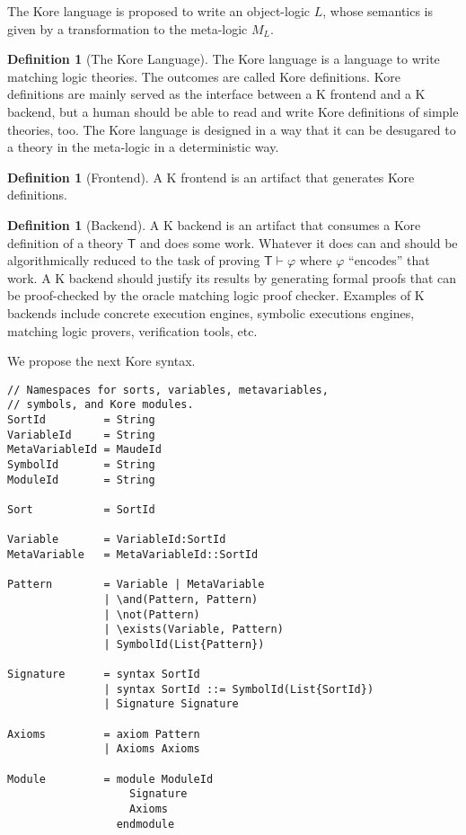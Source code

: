 \documentclass[UTF8]{article}
\newcommand{\comment}[1]
    {\par {\bfseries \color{blue} #1 \par}} %
\newcounter{thmcounter}
\theoremstyle{plain}
\theoremstyle{definition}
\newtheorem{definition}[thmcounter]{Definition}
\theoremstyle{remark}
\begin{document}
The Kore language is proposed to write an object-logic $L$, whose 
semantics is given by a transformation to the meta-logic $M_L$. 
\comment{
\begin{definition}[The Kore Language]
The Kore language is a language to write matching logic theories. The outcomes are called Kore definitions. Kore definitions are mainly served as the interface between a K frontend and a K backend, but a human should be able to read and write Kore definitions of simple theories, too. The Kore language is designed in a way that it can be desugared to a theory in the meta-logic in a deterministic way.
\end{definition}

\begin{definition}[Frontend]
A K frontend is an artifact that generates Kore definitions.
\end{definition}

\begin{definition}[Backend]
A K backend is an artifact that consumes a Kore definition of a theory $\mathsf{T}$ and does some work. Whatever it does can and should be algorithmically reduced to the task of proving $\mathsf{T} \vdash \varphi$ where $\varphi$ ``encodes'' that work. A K backend should justify its results by generating formal proofs that can be proof-checked by the oracle matching logic proof checker. Examples of K backends include concrete execution engines, symbolic executions engines, matching logic provers, verification tools, etc.
\end{definition}
}
We propose the next Kore syntax. 

\begin{Verbatim}[fontsize=\small]
// Namespaces for sorts, variables, metavariables,
// symbols, and Kore modules.
SortId         = String
VariableId     = String
MetaVariableId = MaudeId
SymbolId       = String
ModuleId       = String

Sort           = SortId

Variable       = VariableId:SortId
MetaVariable   = MetaVariableId::SortId

Pattern        = Variable | MetaVariable
               | \and(Pattern, Pattern)
               | \not(Pattern)
               | \exists(Variable, Pattern)
               | SymbolId(List{Pattern})

Signature      = syntax SortId
               | syntax SortId ::= SymbolId(List{SortId})
               | Signature Signature

Axioms         = axiom Pattern
               | Axioms Axioms

Module         = module ModuleId
                   Signature
                   Axioms
                 endmodule
\end{Verbatim}
\end{document}
